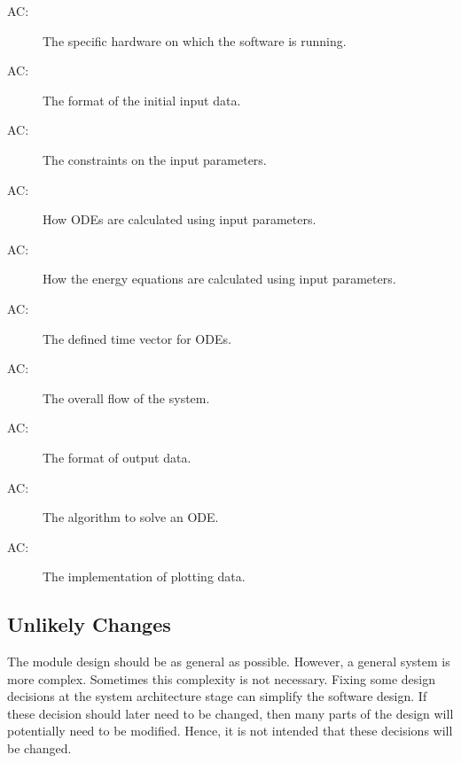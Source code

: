 \documentclass[12pt, titlepage]{article}
\newcounter{acnum}
\newcommand{\actheacnum}{AC\theacnum}
\begin{document}
\begin{description}
\item[ \actheacnum \label{1_ac}:] The specific
  hardware on which the software is running.
\item[ \actheacnum \label{2_ac}:] The format of the initial input data.
\item[ \actheacnum \label{3_ac}:] The constraints on the input parameters. 
\item[ \actheacnum \label{4_ac}:] How ODEs are calculated using input parameters. 
\item[ \actheacnum \label{5_ac}:] How the energy equations are calculated using input parameters. 
\item[ \actheacnum \label{6_ac}:] The defined time vector for ODEs.
\item[ \actheacnum \label{7_ac}:] The overall flow of the system. 
\item[ \actheacnum \label{8_ac}:] The format of output data. 
\item[ \actheacnum \label{9_ac}:] The algorithm to solve an ODE. 
\item[ \actheacnum \label{10_ac}:] The implementation of plotting data. 


\end{description}

\subsection{Unlikely Changes} \label{SecUchange}

The module design should be as general as possible. However, a general system is
more complex. Sometimes this complexity is not necessary. Fixing some design
decisions at the system architecture stage can simplify the software design. If
these decision should later need to be changed, then many parts of the design
will potentially need to be modified. Hence, it is not intended that these
decisions will be changed.
\end{document}
